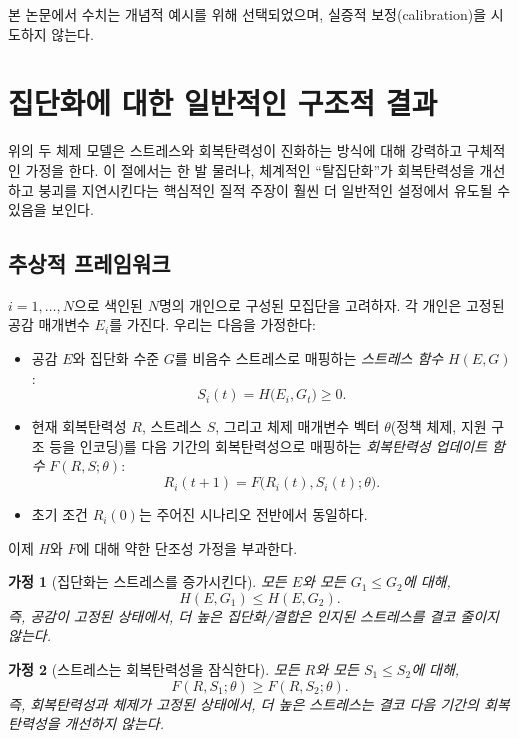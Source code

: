 \documentclass[11pt]{article}
\theoremstyle{plain}
\newtheorem{assumption}{가정}
\begin{document}
본 논문에서 수치는 개념적 예시를 위해 선택되었으며, 실증적 보정(calibration)을 시도하지 않는다.

\section{집단화에 대한 일반적인 구조적 결과}
\label{sec:general}


위의 두 체제 모델은 스트레스와 회복탄력성이 진화하는 방식에 대해 강력하고 구체적인 가정을 한다.
이 절에서는 한 발 물러나, 체계적인 ``탈집단화''가 회복탄력성을 개선하고 붕괴를 지연시킨다는 핵심적인 질적 주장이 훨씬 더 일반적인 설정에서 유도될 수 있음을 보인다.

\subsection{추상적 프레임워크}

$i=1,\dots,N$으로 색인된 $N$명의 개인으로 구성된 모집단을 고려하자. 각 개인은 고정된 공감 매개변수 $E_i$를 가진다.
우리는 다음을 가정한다:
\begin{itemize}
  \item 공감 $E$와 집단화 수준 $G$를 비음수 스트레스로 매핑하는 \emph{스트레스 함수} $H(E,G)$:
  \[
  S_i(t) = H\bigl(E_i, G_t\bigr) \ge 0.
  \]
  \item 현재 회복탄력성 $R$, 스트레스 $S$, 그리고 체제 매개변수 벡터 $\theta$(정책 체제, 지원 구조 등을 인코딩)를 다음 기간의 회복탄력성으로 매핑하는 \emph{회복탄력성 업데이트 함수} $F(R,S;\theta)$:
  \[
  R_i(t+1) = F\bigl(R_i(t), S_i(t); \theta\bigr).
  \]
  \item 초기 조건 $R_i(0)$는 주어진 시나리오 전반에서 동일하다.
\end{itemize}

이제 $H$와 $F$에 대해 약한 단조성 가정을 부과한다.

\begin{assumption}[집단화는 스트레스를 증가시킨다]
\label{ass:group-stress}
모든 $E$와 모든 $G_1 \le G_2$에 대해,
\[
H(E,G_1) \le H(E,G_2).
\]
즉, 공감이 고정된 상태에서, 더 높은 집단화/결합은 인지된 스트레스를 결코 줄이지 않는다.
\end{assumption}

\begin{assumption}[스트레스는 회복탄력성을 잠식한다]
\label{ass:stress-resilience}
모든 $R$와 모든 $S_1 \le S_2$에 대해,
\[
F(R,S_1;\theta) \ge F(R,S_2;\theta).
\]
즉, 회복탄력성과 체제가 고정된 상태에서, 더 높은 스트레스는 결코 다음 기간의 회복탄력성을 개선하지 않는다.
\end{assumption}
\end{document}
